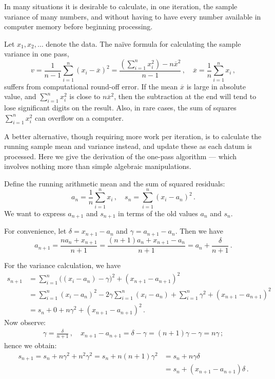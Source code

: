 \documentclass[12pt]{article}
\newcommand{\xb}{\overline{x}}
\begin{document}

In many situations it is desirable to calculate,
in one iteration, the sample variance of many numbers, and without 
having to have every number available
in computer memory before beginning processing.

Let $x_1, x_2, \dotsc$ denote the data.  
The na\"ive formula for calculating the sample
variance in one pass,
\[
v = \frac{1}{n-1} \sum_{i=1}^n (x_i - \xb)^2
= \frac{\left( \sum_{i=1}^n x_i^2 \right) - n\xb^2}{n-1}
\,, \quad \xb = \frac{1}{n} \sum_{i=1}^n x_i\,,
\]
suffers from computational round-off error.
If the mean $\xb$ is large in absolute value,
and $\sum_{i=1}^n x_i^2$ is close to $n \xb^2$,
then the subtraction at the end will tend to lose
significant digits on the result.
Also, in rare cases, the sum of squares $\sum_{i=1}^n x_i^2$
can overflow on a computer.

A better alternative, though requiring more work per iteration,
 is to calculate the running sample mean
and variance instead,
and update these as each datum is processed.
Here we give the derivation of the one-pass algorithm --- which 
involves nothing more than simple algebraic manipulations.

Define the running arithmetic mean
and the sum of squared residuals:
\[
a_n = \frac{1}{n} \sum_{i=1}^n x_i\,,
\quad
s_n = \sum_{i=1}^n (x_i - a_n)^2\,.
\]
We want to express $a_{n+1}$ and $s_{n+1}$
in terms of the old values $a_n$ and $s_n$.

For convenience, let $\delta = x_{n+1} - a_n$
and $\gamma = a_{n+1} - a_n$.
Then we have
\[
a_{n+1} = \frac{n a_n + x_{n+1}}{n+1} = 
\frac{(n+1)a_n + x_{n+1} - a_n}{n+1}
= a_n + \frac{\delta}{n+1}\,.
\]

For the variance calculation,
we have
\begin{align*}
s_{n+1} &= \sum_{i=1}^n \bigl( (x_i - a_n) - \gamma \bigr)^2
+ (x_{n+1} - a_{n+1})^2
\\
&= \sum_{i=1}^n (x_i - a_n)^2 - 2\gamma \sum_{i=1}^n (x_i - a_n)
+ \sum_{i=1}^n \gamma^2 + (x_{n+1} - a_{n+1})^2 \\
&= s_n + 0 + n \gamma^2 + (x_{n+1} - a_{n+1})^2\,.
\end{align*}
Now observe:
\begin{align*}
\gamma = \frac{\delta}{n+1}\,,
\quad
x_{n+1} - a_{n+1} = \delta - \gamma = (n+1) \gamma - \gamma = n\gamma\,;
\end{align*}
hence we obtain:
\begin{align*}
s_{n+1} = s_n + n\gamma^2 + n^2 \gamma^2
= s_n + n(n+1) \gamma^2
&= s_n + n \gamma \delta  \\
&= 
s_n + 
( x_{n+1} - a_{n+1}) \delta\,.
\end{align*}
\end{document}
